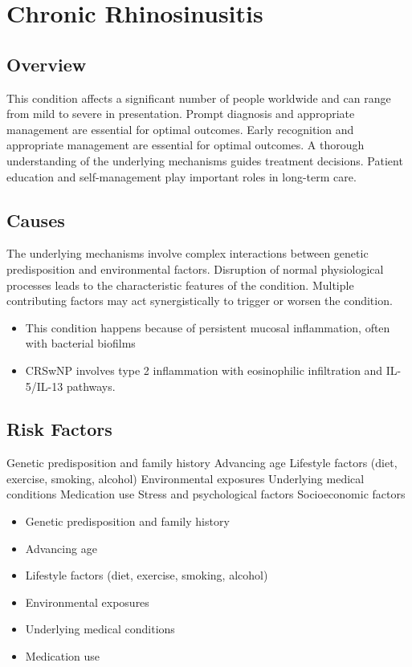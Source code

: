 \chapter{Chronic Rhinosinusitis}
\label{sec:Chronic Rhinosinusitis}

\section{Overview}
This condition affects a significant number of people worldwide and can range from mild to severe in presentation. Prompt diagnosis and appropriate management are essential for optimal outcomes. Early recognition and appropriate management are essential for optimal outcomes. A thorough understanding of the underlying mechanisms guides treatment decisions. Patient education and self-management play important roles in long-term care.
\section{Causes}
The underlying mechanisms involve complex interactions between genetic predisposition and environmental factors. Disruption of normal physiological processes leads to the characteristic features of the condition. Multiple contributing factors may act synergistically to trigger or worsen the condition.

\begin{itemize}[noitemsep]
  \item This condition happens because of persistent mucosal inflammation, often with bacterial biofilms
  \item CRSwNP involves type 2 inflammation with eosinophilic infiltration and IL-5/IL-13 pathways.
\end{itemize}
\section{Risk Factors}
Genetic predisposition and family history Advancing age Lifestyle factors (diet, exercise, smoking, alcohol) Environmental exposures Underlying medical conditions Medication use Stress and psychological factors Socioeconomic factors

\begin{itemize}[noitemsep]
  \item Genetic predisposition and family history
  \item Advancing age
  \item Lifestyle factors (diet, exercise, smoking, alcohol)
  \item Environmental exposures
  \item Underlying medical conditions
  \item Medication use
\end{itemize}
